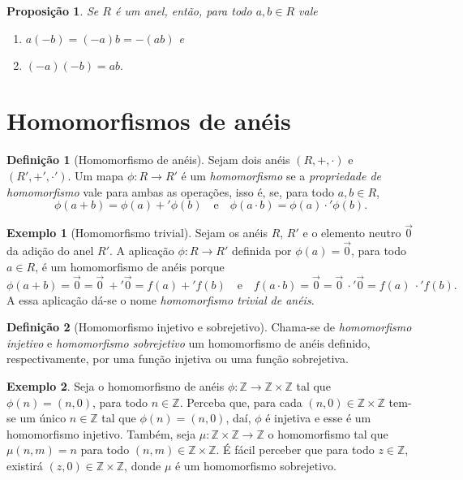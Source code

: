 \documentclass[a4paper,12pt]{article}
\theoremstyle{plain}
\newtheorem{proposicao}{Proposição}[section]
\theoremstyle{definition}
\newtheorem{definicao}{Definição}[section]
\newtheorem{exemplo}{Exemplo}[section]
\begin{document}
	\begin{proposicao}
		Se $R$ é um anel, então, para todo $a,b\in R$ vale
		\begin{enumerate}
			\item $a(-b) = (-a)b = -(ab)$ e
			\item $(-a)(-b) = ab.$
		\end{enumerate}
	\end{proposicao}

	\section{Homomorfismos de anéis}
	
	\begin{definicao}[Homomorfismo de anéis]
		Sejam dois anéis $(R, +, \cdot)$ e $(R', +', \cdot')$. Um mapa $\phi: R \longrightarrow R'$ é um \emph{homomorfismo} se a \emph{propriedade de homomorfismo} vale para ambas as operações, isso é, se, para todo $a,b\in R$,
				$$\phi(a+b) = \phi(a) +' \phi(b) \quad \text{e} \quad \phi(a\cdot b) = \phi(a) \cdot' \phi(b).$$
	\end{definicao}
	
	\begin{exemplo}[Homomorfismo trivial]
		Sejam os anéis $R$, $R'$ e o elemento neutro $\vec 0$ da adição do anel $R'$. A aplicação $\phi: R\longrightarrow R'$ definida por $\phi(a) = \vec 0$, para todo $a\in R$, é um homomorfismo de anéis porque $$\phi(a + b) = \vec 0 = \vec 0 \ +' \vec 0 = f(a) +' f(b) \quad \text{e} \quad f(a\cdot b) = \vec 0 = \vec 0 \ \cdot' \vec 0 = f(a)\ \cdot' f(b).$$
		A essa aplicação dá-se o nome \emph{homomorfismo trivial de anéis}.
	\end{exemplo}
	
	\begin{definicao}[Homomorfismo injetivo e sobrejetivo]
		Chama-se de \emph{homomorfismo injetivo} e \emph{homomorfismo sobrejetivo} um homomorfismo de anéis definido, respectivamente, por uma função injetiva ou uma função sobrejetiva.
	\end{definicao}

	\begin{exemplo}
		Seja o homomorfismo de anéis $\phi: \mathbb{Z} \longrightarrow \mathbb{Z}\times \mathbb{Z}$ tal que $\phi(n) = (n,0)$, para todo $n\in\mathbb{Z}$. Perceba que, para cada $(n,0)\in \mathbb{Z}\times \mathbb{Z}$ tem-se um único $n\in \mathbb{Z}$ tal que $\phi(n) = (n,0)$, daí, $\phi$ é injetiva e esse é um homomorfismo injetivo. Também, seja $\mu:\mathbb{Z}\times\mathbb{Z} \longrightarrow \mathbb{Z}$ o homomorfismo tal que $\mu(n,m) = n$ para todo $(n,m)\in \mathbb{Z}\times \mathbb{Z}$. É fácil perceber que para todo $z\in \mathbb{Z}$, existirá $(z,0)\in \mathbb{Z}\times \mathbb{Z}$, donde $\mu$ é um homomorfismo sobrejetivo.
	\end{exemplo}
	
\end{document}
